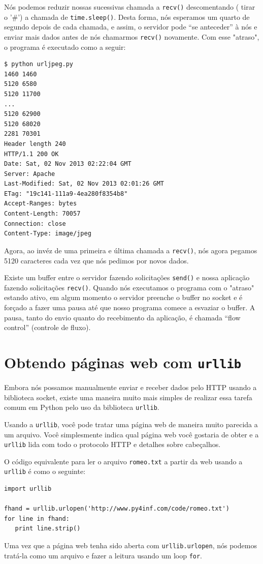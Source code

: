Nós podemos reduzir nossas sucessivas chamada a {\tt recv()}  descomentando
( tirar o '#') a chamada de {\tt time.sleep()}.  Desta forma, nós esperamos
um quarto de segundo depois de cada chamada, e assim, o servidor pode
``se anteceder'' à nós e enviar mais dados antes de nós chamarmos
{\tt recv()} novamente.  Com esse "atraso", o programa é executado
como a seguir:
\beforeverb
\begin{verbatim}
$ python urljpeg.py 
1460 1460
5120 6580
5120 11700
...
5120 62900
5120 68020
2281 70301
Header length 240
HTTP/1.1 200 OK
Date: Sat, 02 Nov 2013 02:22:04 GMT
Server: Apache
Last-Modified: Sat, 02 Nov 2013 02:01:26 GMT
ETag: "19c141-111a9-4ea280f8354b8"
Accept-Ranges: bytes
Content-Length: 70057
Connection: close
Content-Type: image/jpeg
\end{verbatim}
\afterverb
%
Agora, ao invéz de uma primeira e última chamada a {\tt recv()}, nós agora
pegamos 5120 caracteres cada vez que nós pedimos por novos dados.  

Existe um buffer entre o servidor fazendo solicitações {\tt send()} 
e nossa aplicação fazendo solicitações {\tt recv()}.  Quando nós
executamos o programa com o "atraso" estando ativo, em algum momento
o servidor preenche o buffer no socket e é forçado a fazer uma pausa
até que nosso programa comece a esvaziar o buffer.  A pausa, tanto do
envio quanto do recebimento da aplicação, é chamada ``flow control''
(controle de fluxo).

\section{Obtendo páginas web com {\tt urllib}}

Embora nós possamos manualmente enviar e receber dados pelo HTTP 
usando a biblioteca socket, existe uma maneira muito mais simples
de realizar essa tarefa comum em Python pelo uso da biblioteca
{\tt urllib}.

Usando a {\tt urllib}, você pode tratar uma página web
de maneira muito parecida a um arquivo.   Você simplesmente
indica qual página web você gostaria de obter e a
{\tt urllib} lida com todo o protocolo HTTP e detalhes sobre
cabeçalhos.

O código equivalente para ler o arquivo {\tt romeo.txt} a partir
da web usando a {\tt urllib} é como o seguinte:

\beforeverb
\begin{verbatim}
import urllib

fhand = urllib.urlopen('http://www.py4inf.com/code/romeo.txt')
for line in fhand:
   print line.strip()
\end{verbatim}
\afterverb
%
Uma vez que a página web tenha sido aberta com 
{\tt urllib.urlopen}, nós podemos tratá-la
como um arquivo e fazer a leitura usando um loop
{\tt for}.   

